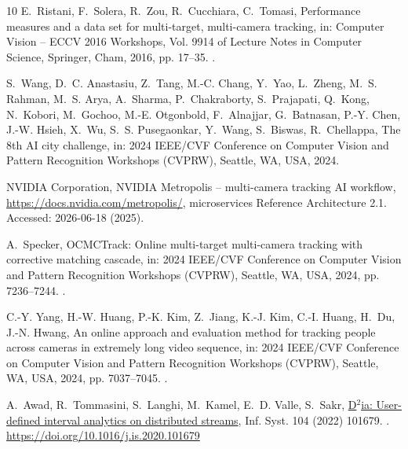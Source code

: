 \documentclass[5p,times]{elsarticle}
\begin{document}
\begin{thebibliography}{10}
E.~Ristani, F.~Solera, R.~Zou, R.~Cucchiara, C.~Tomasi, Performance measures and a data set for multi-target, multi-camera tracking, in: Computer Vision -- ECCV 2016 Workshops, Vol. 9914 of Lecture Notes in Computer Science, Springer, Cham, 2016, pp. 17--35.
\newblock \href {http://dx.doi.org/10.1007/978-3-319-48881-3_2} {}.

S.~Wang, D.~C. Anastasiu, Z.~Tang, M.-C. Chang, Y.~Yao, L.~Zheng, M.~S. Rahman, M.~S. Arya, A.~Sharma, P.~Chakraborty, S.~Prajapati, Q.~Kong, N.~Kobori, M.~Gochoo, M.-E. Otgonbold, F.~Alnajjar, G.~Batnasan, P.-Y. Chen, J.-W. Hsieh, X.~Wu, S.~S. Pusegaonkar, Y.~Wang, S.~Biswas, R.~Chellappa, The 8th {AI} city challenge, in: 2024 IEEE/CVF Conference on Computer Vision and Pattern Recognition Workshops (CVPRW), Seattle, WA, USA, 2024.

{NVIDIA Corporation}, {NVIDIA Metropolis} -- multi-camera tracking {AI} workflow, \url{https://docs.nvidia.com/metropolis/}, microservices Reference Architecture 2.1. Accessed: 2026-06-18 (2025).

A.~Specker, {OCMCTrack}: Online multi-target multi-camera tracking with corrective matching cascade, in: 2024 IEEE/CVF Conference on Computer Vision and Pattern Recognition Workshops (CVPRW), Seattle, WA, USA, 2024, pp. 7236--7244.
\newblock \href {http://dx.doi.org/10.1109/CVPRW63382.2024.00719} {}.

C.-Y. Yang, H.-W. Huang, P.-K. Kim, Z.~Jiang, K.-J. Kim, C.-I. Huang, H.~Du, J.-N. Hwang, An online approach and evaluation method for tracking people across cameras in extremely long video sequence, in: 2024 IEEE/CVF Conference on Computer Vision and Pattern Recognition Workshops (CVPRW), Seattle, WA, USA, 2024, pp. 7037--7045.
\newblock \href {http://dx.doi.org/10.1109/CVPRW63382.2024.00697} {}.

A.~Awad, R.~Tommasini, S.~Langhi, M.~Kamel, E.~D. Valle, S.~Sakr, \href{https://doi.org/10.1016/j.is.2020.101679}{D\({}^{\mbox{2}}\)ia: User-defined interval analytics on distributed streams}, Inf. Syst. 104 (2022) 101679.
\newblock \href {http://dx.doi.org/10.1016/J.IS.2020.101679} {}.
\newline\urlprefix\url{https://doi.org/10.1016/j.is.2020.101679}


\end{thebibliography}
\end{document}
